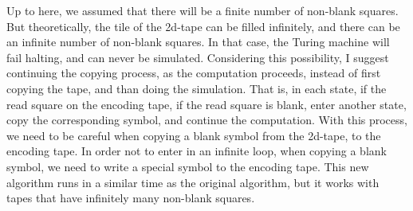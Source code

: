 \documentclass[12pt]{article}
\begin{document}
Up to here, we assumed that there will be a finite number of non-blank squares. But theoretically, the tile of the 2d-tape can be filled infinitely, and there can be an infinite number of non-blank squares. In that case, the Turing machine will fail halting, and can never be simulated. Considering this possibility, I suggest continuing the copying process, as the computation proceeds, instead of first copying the tape, and than doing the simulation. That is, in each state, if the read square on the encoding tape, if the read square is blank, enter another state, copy the corresponding symbol, and continue the computation. With this process, we need to be careful when copying a blank symbol from the 2d-tape, to the encoding tape. In order not to enter in an infinite loop, when copying a blank symbol, we need to write a special symbol to the encoding tape. This new algorithm runs in a similar time as the original algorithm, but it works with tapes that have infinitely many non-blank squares.
\end{document}
